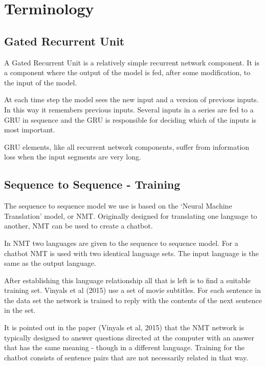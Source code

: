 \chapter{Terminology}

\section{Gated Recurrent Unit}

A Gated Recurrent Unit is a relatively simple recurrent network component. It is a component 
where the output of the model is fed, after some modification, to the input of the model. 

At each time step the model sees the new input and a version of previous inputs. In this
way it remembers previous inputs. Several inputs in a series are fed to a GRU in sequence and the GRU is responsible for deciding which of the inputs is most important.

GRU elements, like all recurrent network components, suffer from information loss when the
input segments are very long.

\section{Sequence to Sequence - Training}

The sequence to sequence model we use is based on the \textquoteleft Neural
Machine Translation\textquoteright{} model, or NMT. Originally designed
for translating one language to another, NMT can be used to create
a chatbot.

In NMT two languages are given to the sequence to sequence model.
For a chatbot NMT is used with two identical language sets. The input
language is the same as the output language.

After establishing this language relationship all that is left is
to find a suitable training set. Vinyals et al (2015)\cite{DBLP:journals/corr/VinyalsL15}
use a set of movie subtitles. For each sentence in the data set the
network is trained to reply with the contents of the next sentence
in the set.

It is pointed out in the paper (Vinyals et al, 2015)\cite{DBLP:journals/corr/VinyalsL15}
that the NMT network is typically designed to answer questions directed
at the computer with an answer that has the same meaning - though
in a different language. Training for the chatbot consists of sentence
pairs that are not necessarily related in that way. 

